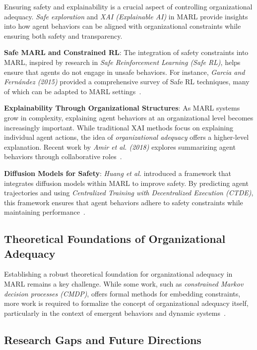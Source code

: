 \documentclass[sigconf,anonymous]{aamas}
\begin{document}
Ensuring safety and explainability is a crucial aspect of controlling organizational adequacy. \textit{Safe exploration} and \textit{XAI (Explainable AI)} in MARL provide insights into how agent behaviors can be aligned with organizational constraints while ensuring both safety and transparency.

\textbf{Safe MARL and Constrained RL}: The integration of safety constraints into MARL, inspired by research in \textit{Safe Reinforcement Learning (Safe RL)}, helps ensure that agents do not engage in unsafe behaviors. For instance, \textit{Garcia and Fernández (2015)} provided a comprehensive survey of Safe RL techniques, many of which can be adapted to MARL settings~\cite{garcia2015comprehensive}.

\textbf{Explainability Through Organizational Structures}: As MARL systems grow in complexity, explaining agent behaviors at an organizational level becomes increasingly important. While traditional XAI methods focus on explaining individual agent actions, the idea of \textit{organizational adequacy} offers a higher-level explanation. Recent work by \textit{Amir et al. (2018)} explores summarizing agent behaviors through collaborative roles~\cite{amir2018highlights}.

\textbf{Diffusion Models for Safety}: \textit{Huang et al.} introduced a framework that integrates diffusion models within MARL to improve safety. By predicting agent trajectories and using \textit{Centralized Training with Decentralized Execution (CTDE)}, this framework ensures that agent behaviors adhere to safety constraints while maintaining performance~\cite{huang2024diffusion}.

\subsection{Theoretical Foundations of Organizational Adequacy}

Establishing a robust theoretical foundation for organizational adequacy in MARL remains a key challenge. While some work, such as \textit{constrained Markov decision processes (CMDP)}, offers formal methods for embedding constraints, more work is required to formalize the concept of organizational adequacy itself, particularly in the context of emergent behaviors and dynamic systems~\cite{altman1999cmdp}.

\subsection{Research Gaps and Future Directions}
\end{document}
